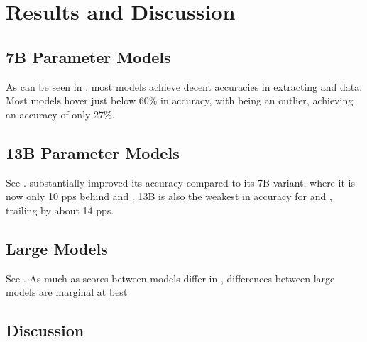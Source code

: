 \chapter{Results and Discussion}\label{chap:results}





\section{7B Parameter Models}\label{sec:result:7b}
As can be seen in , most models achieve decent accuracies in extracting \ttemp and \ttime data.
Most models hover just below 60\% in \tsolv accuracy, with  being an outlier, achieving an accuracy of only 27\%.

\section{13B Parameter Models}\label{sec:result:13b}
See . 
 substantially improved its \tsolv accuracy compared to its 7B variant, where it is now only 10 \glspl{pp} behind  and .
 13B is also the weakest in accuracy for \ttemp and \ttime, trailing by about 14 \glspl{pp}.

\section{Large Models}\label{sec:result:large}
See . As much as scores between models differ in , differences between large models are marginal at best

\section{Discussion}\label{sec:discussion}



